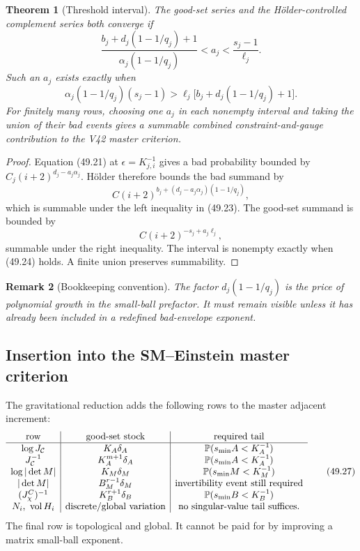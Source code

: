 \documentclass[11pt]{article}
\newtheorem{theorem}{Theorem}[section]
\newtheorem{remark}[theorem]{Remark}
\begin{document}
\begin{theorem}[Threshold interval]
\label{thm:v11v49-threshold}
The good-set series and the Hölder-controlled complement series both
converge if
\[
 \frac{b_j+d_j(1-1/q_j)+1}
      {\alpha_j(1-1/q_j)}<a_j<
                         \frac{s_j-1}{\ell_j}.                 \tag{49.23}
\]
Such an \(a_j\) exists exactly when
\[
 \alpha_j(1-1/q_j)(s_j-1)>
        \ell_j\bigl[b_j+d_j(1-1/q_j)+1\bigr].                 \tag{49.24}
\]
For finitely many rows, choosing one \(a_j\) in each nonempty interval
and taking the union of their bad events gives a summable combined
constraint-and-gauge contribution to the V42 master criterion.
\end{theorem}

\begin{proof}
Equation (49.21) at \(\epsilon=K_{j,i}^{-1}\) gives a bad probability
bounded by
\(C_j(i+2)^{d_j-a_j\alpha_j}\).  Hölder therefore bounds the bad
summand by
\[
 C(i+2)^{b_j+(d_j-a_j\alpha_j)(1-1/q_j)},                     \tag{49.25}
\]
which is summable under the left inequality in (49.23).  The good-set
summand is bounded by
\[
 C(i+2)^{-s_j+a_j\ell_j},                                     \tag{49.26}
\]
summable under the right inequality.  The interval is nonempty exactly
when (49.24) holds.  A finite union preserves summability.
\end{proof}

\begin{remark}[Bookkeeping convention]
The factor \(d_j(1-1/q_j)\) is the price of polynomial growth in the
small-ball prefactor.  It must remain visible unless it has already
been included in a redefined bad-envelope exponent.
\end{remark}

\subsection{Insertion into the SM--Einstein master criterion}

\begin{ledger}
\label{led:v11v49-master}
The gravitational reduction adds the following rows to the master
adjacent increment:
\[
\begin{array}{c|c|c}
\text{row}&\text{good-set stock}&\text{required tail}\\ \hline
\log J_{\cal C}&K_A\delta_A&
 \mathbb P(s_{\min}A<K_A^{-1})\\
J_{\cal C}^{-1}&K_A^{m+1}\delta_A&
 \mathbb P(s_{\min}A<K_A^{-1})\\
\log|\det M|&K_M\delta_M&
 \mathbb P(s_{\min}M<K_M^{-1})\\
|\det M|&B_M^{r-1}\delta_M&
 \text{invertibility event still required}\\
(J_\chi^C)^{-1}&K_B^{r+1}\delta_B&
 \mathbb P(s_{\min}B<K_B^{-1})\\
N_i,\ \operatorname{vol}H_i&\text{discrete/global variation}&
 \text{no singular-value tail suffices}.
\end{array}                                                     \tag{49.27}
\]
The final row is topological and global.  It cannot be paid for by
improving a matrix small-ball exponent.
\end{ledger}
\end{document}
